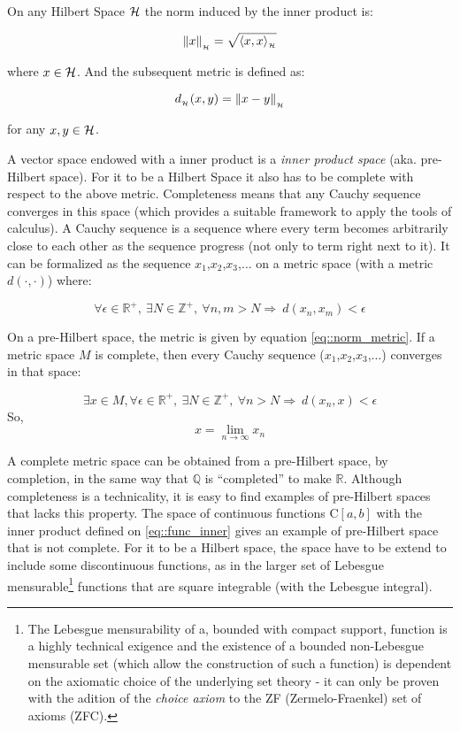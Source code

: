 On any Hilbert Space $\mathcal{H}$ the norm induced by the inner product is:

\begin{equation}
  \left\lVert x\right\rVert_{_{\mathcal{H}}} = \sqrt{ \langle x,x\rangle_{_{\mathcal{H}}} }
\end{equation}

where $x \in \mathcal{H}$. And the subsequent metric is defined as:

\begin{equation}\label{eq::norm_metric}
  d_{_{\mathcal{H}}}(x,y) = \left\lVert x - y \right\rVert_{_{\mathcal{H}}}
\end{equation}

for any $x,y \in \mathcal{H}$.

A vector space endowed with a inner product is a \textit{inner product space}
(aka. pre-Hilbert space). For it to be a Hilbert Space it also has to be complete
with respect to the above metric. Completeness means that any Cauchy sequence
converges in this space (which provides a suitable framework to apply the tools
of calculus). A Cauchy sequence is a sequence where every term becomes
arbitrarily close to each other as the sequence progress (not only to term
right next to it). It can be formalized as the sequence
$x_1$,$x_2$,$x_3$,$\ldots$ on a metric space (with a metric $d( \cdot ,\cdot)$)
where:


\[ \forall \epsilon \in \mathbb{R}^+, ~\exists N \in \mathbb{Z}^+, ~\forall
n,m>N \Longrightarrow ~d(x_n,x_m)<\epsilon
\]

On a pre-Hilbert space, the metric is given by equation \ref{eq::norm_metric}.
If a metric space $M$ is complete, then every Cauchy sequence
($x_1$,$x_2$,$x_3$,$\ldots$) converges in that space:

\[ \exists x \in M, \forall \epsilon \in \mathbb{R}^+, ~\exists N \in \mathbb{Z}^+, ~\forall
n>N \Longrightarrow ~d(x_n,x)<\epsilon
\]
So,
\[ x = \lim_{n\to\infty} x_n \]

A complete metric space can be obtained from a pre-Hilbert space, by completion,
in the same way that $\mathbb{Q}$ is ``completed'' to make $\mathbb{R}$.
Although completeness is a technicality, it is easy to find examples of
pre-Hilbert spaces that lacks this property. The space of continuous functions
C$[a,b]$ with the inner product defined on \ref{eq::func_inner} gives an example
of pre-Hilbert space that is not complete. For it to be a Hilbert space, the
space have to be extend to include some discontinuous functions, as in the larger
set of Lebesgue mensurable\footnote{The Lebesgue mensurability of a, bounded
with compact support, function is a highly technical exigence and the existence
of a bounded non-Lebesgue mensurable set (which allow the construction of such a
function) is dependent on the axiomatic choice of the underlying set theory - it
can only be proven with the adition of the \textit{choice axiom} to the
ZF (Zermelo-Fraenkel) set of axioms (ZFC). } functions that are square
integrable (with the Lebesgue integral).

